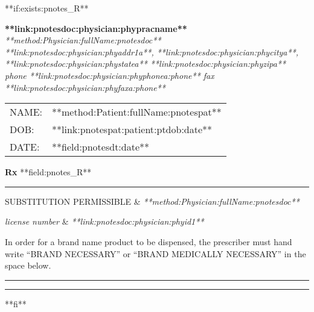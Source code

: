 \documentclass{article}
\begin{document}
\begin{itemize}
**if:exists:pnotes_R**
\eject
\begin{center}
	{\textbf{**link:pnotesdoc:physician:phypracname**}} \\
        {\textsl{**method:Physician:fullName:pnotesdoc**}} \\
        \textsl{**link:pnotesdoc:physician:phyaddr1a**, **link:pnotesdoc:physician:phycitya**, **link:pnotesdoc:physician:phystatea** **link:pnotesdoc:physician:phyzipa** } \\
        \textsl{phone **link:pnotesdoc:physician:phyphonea:phone** fax **link:pnotesdoc:physician:phyfaxa:phone**}  \\
\end{center}
\vskip 24pt
\begin{tabular}{ll}
	NAME:	&	**method:Patient:fullName:pnotespat**	\\
	DOB:	&	**link:pnotespat:patient:ptdob:date**	\\
	DATE:	&	**field:pnotesdt:date**
\end{tabular}
\vskip 18pt
\textbf {Rx}
\vskip 24pt
**field:pnotes_R**
\vskip 36pt
\hrule
{SUBSTITUTION PERMISSIBLE} & \hskip 3cm \textsl{**method:Physician:fullName:pnotesdoc**}

\hskip 8.5cm \textsl{license number } & \textsl{**link:pnotesdoc:physician:phyid1**}

\vskip 24pt
{In order for a brand name product to be dispensed, the prescriber must hand
write ``BRAND NECESSARY'' or ``BRAND MEDICALLY NECESSARY'' in the space
below.}
\vskip 36pt
\hrule
\vskip 48pt
\hrule
{}
**fi**
\end{itemize}
\end{document}
